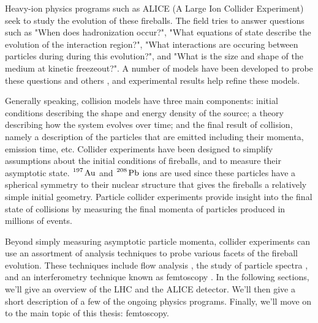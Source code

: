 Heavy-ion physics programs such as ALICE (A Large Ion Collider Experiment) seek to study the evolution of these fireballs.
The field tries to answer questions such as "When does hadronization occur?", "What equations of state describe the evolution of the interaction region?", "What interactions are occuring between particles during during this evolution?", and "What is the size and shape of the medium at kinetic freezeout?".
A number of models have been developed to probe these questions and others \cite{Werner:2010aa,Karpenko:2012yf,Bozek:2012qs,Schenke:2009gb}, and experimental results help refine these models.

Generally speaking, collision models have three main components: initial conditions describing the shape and energy density of the source; a theory describing how the system evolves over time; and the final result of collision, namely a description of the particles that are emitted including their momenta, emission time, etc.
Collider experiments have been designed to simplify assumptions about the initial conditions of fireballs, and to measure their asymptotic state.
$\ce{^197 \mathrm{Au}}$ and $\ce{^208 \mathrm{Pb}}$ ions are used since these particles have a spherical symmetry to their nuclear structure that gives the fireballs a relatively simple initial geometry.
Particle collider experiments provide insight into the final state of collisions by measuring the final momenta of particles produced in millions of events.



Beyond simply measuring asymptotic particle momenta, collider experiments can use an assortment of analysis techniques to probe various facets of the fireball evolution.
These techniques include flow analysis \cite{Aamodt:2010pa,Heinz:2013th}, the study of particle spectra \cite{Aamodt:2010cz}, and an interferometry technique known as femtoscopy \cite{Aamodt:2011mr,Lisa:2005dd}.
In the following sections, we'll give an overview of the LHC and the ALICE detector.
We'll then give a short description of a few of the ongoing physics programs.
Finally, we'll move on to the main topic of this thesis: femtoscopy.

